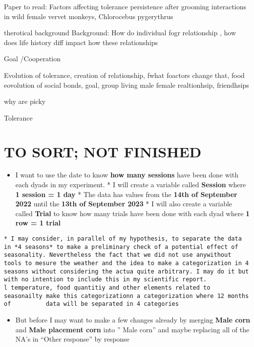 \documentclass[
]{article}
\providecommand{\tightlist}{%
  \setlength{\itemsep}{0pt}\setlength{\parskip}{0pt}}
\begin{document}
Paper to read: Factors affecting tolerance persistence after grooming
interactions in wild female vervet monkeys, Chlorocebus pygerythrus

therotical background Background: How do individual fogr relationship ,
how does life history diff impact how these relationships

Goal /Cooperation

Evolution of tolerance, creation of relationship, fwhat foactors change
that, food eovolution of social bonds, goal, group living male female
realtionhsip, friendhsips

why are picky

Tolerance

\hypertarget{to-sort-not-finished}{%
\section{TO SORT; NOT FINISHED}\label{to-sort-not-finished}}

\begin{itemize}
\tightlist
\item
  I want to use the date to know \textbf{how many sessions} have been
  done with each dyads in my experiment. * I will create a variable
  called \textbf{Session} where \textbf{1 session = 1 day} * The data
  has values from the \textbf{14th of September 2022} until the
  \textbf{13th of September 2023} * I will also create a variable called
  \textbf{Trial} to know how many trials have been done with each dyad
  where \textbf{1 row = 1 trial}
\end{itemize}

\begin{verbatim}
* I may consider, in parallel of my hypothesis, to separate the data in *4 seasons* to make a preliminary check of a potential effect of seasonality. Nevertheless the fact that we did not use anywithout      tools to mesure the weather and the idea to make a categorization in 4 seasons without considering the actua quite arbitrary. I may do it but with no intention to include this in my scientific report.
l temperature, food quantitiy and other elements related to seasonailty make this categorizationn a categorization where 12 months of          data will be separated in 4 categories
\end{verbatim}

\begin{itemize}
\tightlist
\item
  But before I may want to make a few changes already by merging
  \textbf{Male corn} and \textbf{Male placement corn} into '' Male
  corn'' and maybe replacing all of the NA's in ``Other response'' by
  response
\end{itemize}
\end{document}

